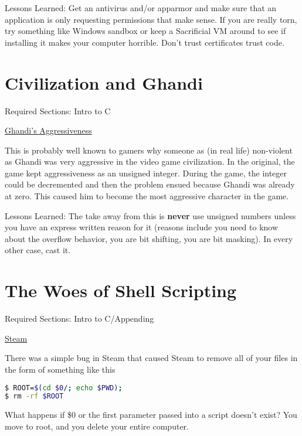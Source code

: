 Lessons Learned: Get an antivirus and/or apparmor and make sure that an application is only requesting permissions that make sense. If you are really torn, try something like Windows sandbox or keep a Sacrificial VM around to see if installing it makes your computer horrible. Don't trust certificates trust code.

\section{Civilization and Ghandi}

Required Sections: Intro to C

\href{https://www.geek.com/games/why-gandhi-is-always-a-warmongering-jerk-in-civilization-1608515/}{Ghandi's Aggressiveness}

This is probably well known to gamers why someone as (in real life) non-violent as Ghandi was very aggressive in the video game civilization.
In the original, the game kept aggressiveness as an unsigned integer.
During the game, the integer could be decremented and then the problem ensued because Ghandi was already at zero.
This caused him to become the most aggressive character in the game.

Lessons Learned: The take away from this is \textbf{never} use unsigned numbers unless you have an express written reason for it (reasons include you need to know about the overflow behavior, you are bit shifting, you are bit masking).
In every other case, cast it.


\section{The Woes of Shell Scripting}

Required Sections: Intro to C/Appending

\href{https://www.pcworld.com/article/2871653/scary-steam-for-linux-bug-erases-all-the-personal-files-on-your-pc.html}{Steam}

There was a simple bug in Steam that caused Steam to remove all of your files in the form of something like this

\begin{lstlisting}[language=bash]
$ ROOT=$(cd $0/; echo $PWD);
$ rm -rf $ROOT
\end{lstlisting}

What happens if \$0 or the first parameter passed into a script doesn't exist? You move to root, and you delete your entire computer.

